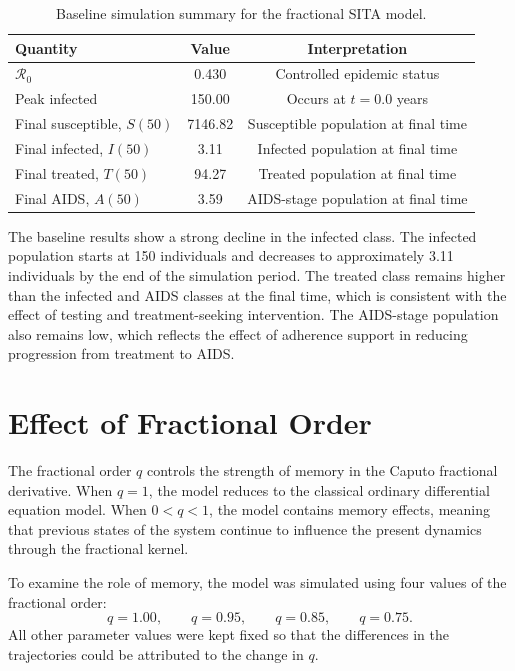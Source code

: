 \documentclass[12pt,a4paper,oneside]{report}
\begin{document}
\begin{table}[H]
\centering
\caption{Baseline simulation summary for the fractional SITA model.}
\label{tab:baseline_results}
\begin{tabular}{lcc}
\toprule
Quantity & Value & Interpretation\\
\midrule
$\mathcal{R}_0$ & 0.430 & Controlled epidemic status\\
Peak infected & 150.00 & Occurs at $t=0.0$ years\\
Final susceptible, $S(50)$ & 7146.82 & Susceptible population at final time\\
Final infected, $I(50)$ & 3.11 & Infected population at final time\\
Final treated, $T(50)$ & 94.27 & Treated population at final time\\
Final AIDS, $A(50)$ & 3.59 & AIDS-stage population at final time\\
\bottomrule
\end{tabular}
\end{table}

The baseline results show a strong decline in the infected class. The infected population starts at 150 individuals and decreases to approximately 3.11 individuals by the end of the simulation period. The treated class remains higher than the infected and AIDS classes at the final time, which is consistent with the effect of testing and treatment-seeking intervention. The AIDS-stage population also remains low, which reflects the effect of adherence support in reducing progression from treatment to AIDS.

\section{Effect of Fractional Order}
The fractional order $q$ controls the strength of memory in the Caputo fractional derivative. When $q=1$, the model reduces to the classical ordinary differential equation model. When $0<q<1$, the model contains memory effects, meaning that previous states of the system continue to influence the present dynamics through the fractional kernel.

To examine the role of memory, the model was simulated using four values of the fractional order:
\[
q=1.00,\qquad q=0.95,\qquad q=0.85,\qquad q=0.75.
\]
All other parameter values were kept fixed so that the differences in the trajectories could be attributed to the change in $q$.
\end{document}
